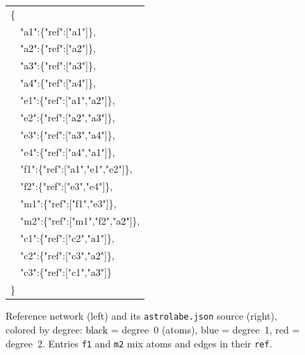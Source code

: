 \begin{figure}[ht]
\centering
\begin{minipage}[t]{0.48\textwidth}
\vspace{0pt}
\centering
\scalebox{1.5}{}
\end{minipage}%
\hspace{4pt}%
\begin{minipage}[t]{0.48\textwidth}
\vspace{0pt}
{\scriptsize\ttfamily
\begin{tabular}{@{}l@{}}
\{\\
\ \ \textcolor{black}{"a1"}:\{"ref":["\textcolor{black}{a1}"]\},\\
\ \ \textcolor{black}{"a2"}:\{"ref":["\textcolor{black}{a2}"]\},\\
\ \ \textcolor{black}{"a3"}:\{"ref":["\textcolor{black}{a3}"]\},\\
\ \ \textcolor{black}{"a4"}:\{"ref":["\textcolor{black}{a4}"]\},\\
\ \ \textcolor{blue!70!black}{"e1"}:\{"ref":["\textcolor{black}{a1}","\textcolor{black}{a2}"]\},\\
\ \ \textcolor{blue!70!black}{"e2"}:\{"ref":["\textcolor{black}{a2}","\textcolor{black}{a3}"]\},\\
\ \ \textcolor{blue!70!black}{"e3"}:\{"ref":["\textcolor{black}{a3}","\textcolor{black}{a4}"]\},\\
\ \ \textcolor{blue!70!black}{"e4"}:\{"ref":["\textcolor{black}{a4}","\textcolor{black}{a1}"]\},\\
\ \ \textcolor{red!70!black}{"f1"}:\{"ref":["\textcolor{black}{a1}","\textcolor{blue!70!black}{e1}","\textcolor{blue!70!black}{e2}"]\},\\
\ \ \textcolor{blue!70!black}{"f2"}:\{"ref":["\textcolor{blue!70!black}{e3}","\textcolor{blue!70!black}{e4}"]\},\\
\ \ \textcolor{blue!70!black}{"m1"}:\{"ref":["\textcolor{red!70!black}{f1}","\textcolor{blue!70!black}{e3}"]\},\\
\ \ \textcolor{red!70!black}{"m2"}:\{"ref":["\textcolor{blue!70!black}{m1}","\textcolor{blue!70!black}{f2}","\textcolor{black}{a2}"]\},\\
\ \ \textcolor{blue!70!black}{"c1"}:\{"ref":["\textcolor{blue!70!black}{c2}","\textcolor{black}{a1}"]\},\\
\ \ \textcolor{blue!70!black}{"c2"}:\{"ref":["\textcolor{blue!70!black}{c3}","\textcolor{black}{a2}"]\},\\
\ \ \textcolor{blue!70!black}{"c3"}:\{"ref":["\textcolor{blue!70!black}{c1}","\textcolor{black}{a3}"]\}\\
\}
\end{tabular}
}
\end{minipage}
\caption{Reference network (left) and its \texttt{astrolabe.json} source (right), colored by degree: \textcolor{black}{black} = degree~0 (atoms), \textcolor{blue!70!black}{blue} = degree~1, \textcolor{red!70!black}{red} = degree~2. Entries \texttt{f1} and \texttt{m2} mix atoms and edges in their \texttt{ref}.}
\label{fig:astrolabe-network}
\end{figure}

